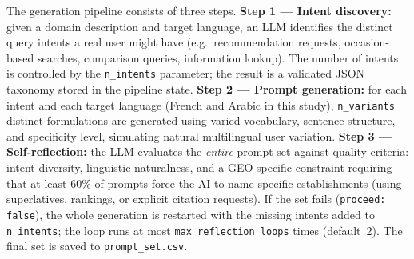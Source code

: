 The generation pipeline consists of three steps. \textbf{Step 1 --- Intent
discovery:} given a domain description and target language, an LLM identifies
the distinct query intents a real user might have (e.g.\ recommendation requests,
occasion-based searches, comparison queries, information lookup). The number of
intents is controlled by the \texttt{n\_intents} parameter; the result is a
validated JSON taxonomy stored in the pipeline state. \textbf{Step 2 --- Prompt
generation:} for each intent and each target language (French and Arabic in this study),
\texttt{n\_variants} distinct formulations are generated using varied vocabulary,
sentence structure, and specificity level, simulating natural multilingual user
variation. \textbf{Step 3 --- Self-reflection:} the LLM evaluates the \textit{entire} prompt
set against quality criteria: intent diversity, linguistic naturalness, and a
GEO-specific constraint requiring that at least 60\% of prompts force the AI to
name specific establishments (using superlatives, rankings, or explicit citation
requests). If the set fails (\texttt{proceed: false}), the whole generation is
restarted with the missing intents added to \texttt{n\_intents}; the loop runs at
most \texttt{max\_reflection\_loops} times (default~2). The final set is saved to
\texttt{prompt\_set.csv}.

